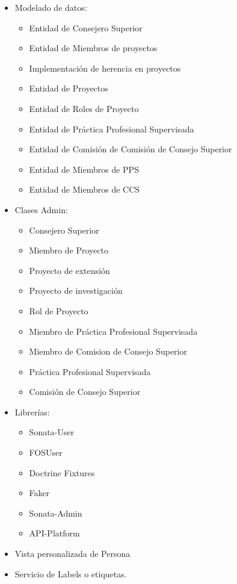 \begin{itemize}
    \item Modelado de datos:
    \begin{itemize}
        \item Entidad de Consejero Superior
        \item Entidad de Miembros de proyectos
        \item Implementación de herencia en proyectos
        \item Entidad de Proyectos
        \item Entidad de Roles de Proyecto
        \item Entidad de Práctica Profesional Supervisada
        \item Entidad de Comisión de Comisión de Consejo Superior
        \item Entidad de Miembros de PPS
        \item Entidad de Miembros de CCS
    \end{itemize}
    \item Clases Admin:
    \begin{itemize}
        \item Consejero Superior
        \item Miembro de Proyecto
        \item Proyecto de extensión
        \item Proyecto de investigación
        \item Rol de Proyecto
        \item Miembro de Práctica Profesional Supervisada
        \item Miembro de Comision de Consejo Superior
        \item Práctica Profesional Supervisada
        \item Comisión de Consejo Superior
    \end{itemize}
    \item Librerías:
    \begin{itemize}
        \item Sonata-User
        \item FOSUser
        \item Doctrine Fixtures
        \item Faker
        \item Sonata-Admin
        \item API-Platform
    \end{itemize}
    \item Vista personalizada de Persona
    \item Servicio de Labels o etiquetas.
\end{itemize}
